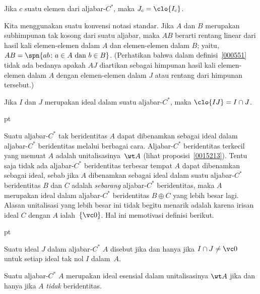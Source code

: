 \begin{prop} Jika $c$ suatu elemen dari aljabar-$C^*$, maka $J_c = \clo{I_c}$.
\end{prop}

\begin{notn} Kita menggunakan suatu konvensi notasi standar. Jika $A$ dan $B$ merupakan subhimpunan tak kosong
dari suatu aljabar, maka $AB$ berarti rentang linear dari hasil kali elemen-elemen dalam $A$ dan
elemen-elemen dalam $B$; yaitu,
$AB = \spn\{ab \colon \text{$a \in A$ dan $b \in B$}\}$. (Perhatikan bahwa dalam
definisi~\ref{000551} tidak ada bedanya apakah $AJ$ diartikan sebagai himpunan
hasil kali elemen-elemen dalam $A$ dengan elemen-elemen dalam $J$ atau rentang dari himpunan tersebut.)
\end{notn}

\begin{prop} Jika $I$ dan $J$ merupakan ideal dalam suatu aljabar-$C^*$, maka $\clo{IJ} =
I \cap J$.
\end{prop}

 pt

Suatu aljabar-$C^*$ tak beridentitas $A$ dapat dibenamkan sebagai ideal dalam aljabar-$C^*$ beridentitas melalui
berbagai cara. Aljabar-$C^*$ beridentitas terkecil yang memuat $A$ adalah unitalisasinya~$\wt
A$ (lihat proposisi~\ref{0015213}). Tentu saja tidak ada aljabar-$C^*$ beridentitas terbesar tempat
$A$ dapat dibenamkan sebagai ideal, sebab jika $A$ dibenamkan sebagai ideal dalam suatu
aljabar-$C^*$ beridentitas $B$ dan $C$ adalah \emph{sebarang} aljabar-$C^*$ beridentitas, maka $A$ merupakan ideal dalam
aljabar-$C^*$ beridentitas $B \oplus C$ yang lebih besar lagi. Alasan unitalisasi yang lebih besar ini
tidak begitu menarik adalah karena irisan ideal $C$ dengan $A$ ialah~$\{\vc 0\}$.
Hal ini memotivasi definisi berikut.

 pt

\begin{defn} Suatu ideal $J$ dalam aljabar-$C^*$ $A$ disebut
 jika dan hanya jika $I \cap J \ne \vc 0$ untuk setiap ideal tak nol $I$ dalam~$A$.
\end{defn}

\begin{exam} Suatu aljabar-$C^*$ $A$ merupakan ideal esensial dalam unitalisasinya $\wt A$ jika dan
hanya jika $A$ \emph{tidak} beridentitas.
\end{exam}

